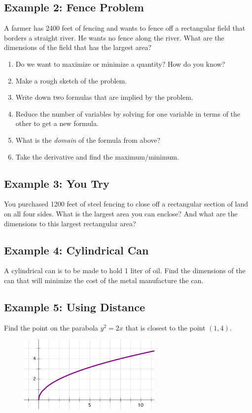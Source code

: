 \documentclass[10pt]{book}
\theoremstyle{definition}
\begin{document}
\subsection*{Example 2: Fence Problem}
A farmer has 2400 feet of fencing and wants to fence off a rectangular field that borders a straight river. He wants no fence along the river. What are the dimensions of the field that has the largest area?
\begin{enumerate}[label=(\alph*)]
    \item Do we want to maximize or minimize a quantity? How do you know?
    \item Make a rough sketch of the problem.\vspace{4cm}
    \item Write down two formulas that are implied by the problem.\vspace{2cm}
    \item Reduce the number of variables by solving for one variable in terms of the other to get a new formula.\vspace{3cm}
    \item What is the \textit{domain} of the formula from above?\vspace{1cm}
    \item Take the derivative and find the maximum/minimum.
\end{enumerate}
\clearpage
\subsection*{Example 3: You Try} You purchased 1200 feet of steel fencing to close off a rectangular section of land on all four sides. What is the largest area you can enclose? And what are the dimensions to this largest rectangular area?
\clearpage
\subsection*{Example 4: Cylindrical Can}
A cylindrical can is to be made to hold 1 liter of oil. Find the dimensions of the can that will minimize the cost of the metal manufacture the can.
\clearpage
\subsection*{Example 5: Using Distance}
Find the point on the parabola $y^2=2x$ that is closest to the point $(1,4)$.
\begin{figure}[h!]
    \includegraphics[width=7cm]{distprob.png}
\end{figure}
\end{document}
